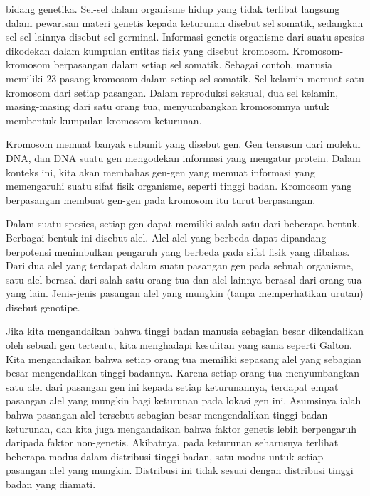 bidang genetika.  Sel-sel dalam organisme hidup yang tidak terlibat langsung dalam
pewarisan materi genetis kepada keturunan disebut sel somatik, sedangkan sel-sel lainnya disebut
sel germinal.  Informasi genetis organisme dari suatu spesies dikodekan dalam kumpulan entitas
fisik yang disebut kromosom.  Kromosom-kromosom berpasangan dalam setiap sel
somatik.  Sebagai contoh, manusia memiliki 23 pasang kromosom dalam setiap sel somatik.  Sel
kelamin memuat satu kromosom dari setiap pasangan.  Dalam reproduksi seksual, dua sel kelamin,
masing-masing dari satu orang tua, menyumbangkan kromosomnya untuk membentuk kumpulan kromosom
keturunan.
\par
Kromosom memuat banyak subunit yang disebut gen.  Gen tersusun dari molekul
DNA, dan DNA suatu gen mengodekan informasi yang mengatur protein.  Dalam konteks ini,
kita akan membahas gen-gen yang memuat informasi yang memengaruhi suatu sifat fisik organisme,
seperti tinggi badan.  Kromosom yang berpasangan membuat gen-gen pada kromosom itu turut berpasangan.
\par
Dalam suatu spesies, setiap gen dapat memiliki salah satu dari beberapa bentuk.  Berbagai bentuk
ini disebut alel.  Alel-alel yang berbeda dapat dipandang berpotensi menimbulkan
pengaruh yang berbeda pada sifat fisik yang dibahas.  Dari dua alel yang terdapat dalam suatu
pasangan gen pada sebuah organisme, satu alel berasal dari salah satu orang tua dan alel lainnya
berasal dari orang tua yang lain.  Jenis-jenis pasangan alel yang mungkin (tanpa memperhatikan
urutan) disebut genotipe.
\par
Jika kita mengandaikan bahwa tinggi badan manusia sebagian besar dikendalikan oleh sebuah gen
tertentu, kita menghadapi kesulitan yang sama seperti Galton.  Kita mengandaikan bahwa setiap orang
tua memiliki sepasang alel yang sebagian besar mengendalikan tinggi badannya.  Karena setiap orang
tua menyumbangkan satu alel dari pasangan gen ini kepada setiap keturunannya, terdapat empat
pasangan alel yang mungkin bagi keturunan pada lokasi gen ini.  Asumsinya ialah bahwa pasangan alel
tersebut sebagian besar mengendalikan tinggi badan keturunan, dan kita juga mengandaikan bahwa
faktor genetis lebih berpengaruh daripada faktor non-genetis.  Akibatnya, pada keturunan seharusnya
terlihat beberapa modus dalam distribusi tinggi badan, satu modus untuk setiap pasangan alel yang
mungkin.  Distribusi ini tidak sesuai dengan distribusi tinggi badan yang diamati.
\par
